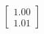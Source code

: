 \documentclass[preview]{standalone}
\begin{document}
\begin{align*}
\begin{bmatrix} 1.00 \\ 1.01 \end{bmatrix}
\end{align*}
\end{document}
